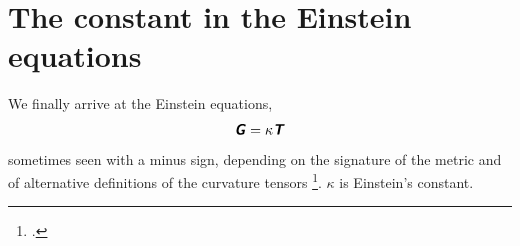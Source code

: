 \documentclass[\ifafour a4paper,12pt,\else a5paper,10pt,\fi%
onecolumn,oneside,article,%
british%
]{memoir}
\makeatletter
\theoremstyle{remark}
\theoremstyle{innote}
\newcommand*{\mathte}[1]{\textbf{\textit{\textsf{#1}}}}
\newcommand*{\citep}{\footcites}
\newcommand*{\amp}{\&}
\renewcommand*{\|}[1][]{\nonscript\,#1\vert\nonscript\;\mathopen{}}
\newcommand*{\sect}{\S}%
\newcommand*{\chap}{ch.}%
\newcommand*{\etal}{{et al.}}
\newcommand*{\puzzle}{{\fontencoding{U}\fontfamily{fontawesometwo}\selectfont\symbol{225}}}
\newcommand{\mynote}[1]{ {\color{notecolour}\puzzle\ #1}}
\newcommand*{\q}{}%
\DeclareRobustCommand*{\q}{%
  \mathord{\mathpalette\bigcdot@{}}%
}
\newcommand*{\bigcdot@scalefactor}{0.7}
\newcommand*{\bigcdot@widthfactor}{1.5}
\newcommand*{\bigcdot@}[2]{%
  \sbox0{$#1\vcenter{}$}%
  \sbox2{$#1\cdot\m@th$}%
  \hbox to \bigcdot@widthfactor\wd2{%
    \hfil
    \raise\ht0\hbox{%
      \scalebox{\bigcdot@scalefactor}{%
        \lower\ht0\hbox{$#1\bullet\m@th$}%
      }%
    }%
    \hfil
  }%
}
\newcommand*{\yT}{\bm{\mathcal{T}}}
\newcommand*{\yTe}{\mathte{T}}
\newcommand*{\yG}{\mathte{G}}
\renewcommand*{\i}{\indices}
\newcommand*{\yk}{\kappa}
\newcommand*{\yt}{\sigma}
\newcommand*{\rul}{{\mkern2mu\rule[-0.1ex]{0.75pt}{1.1ex}\mkern2mu}}
\DeclarePairedDelimiter\mul{\rul}{\rul}%
\makeatother
\begin{document}








\section{The constant in the Einstein equations}
\label{sec:einstein_eq}

We finally arrive at the Einstein equations,
\begin{equation}
  \label{eq:einstein}
  \yG%
  = \yk \yTe%
\end{equation}
sometimes seen with a minus sign, depending on the signature of the metric
and of alternative definitions of the curvature tensors \citep[see the
\emph{Table of sign conventions} on the final pages
of][]{misneretal1970_r1973}. $\yk$ is Einstein's constant.
\end{document}
